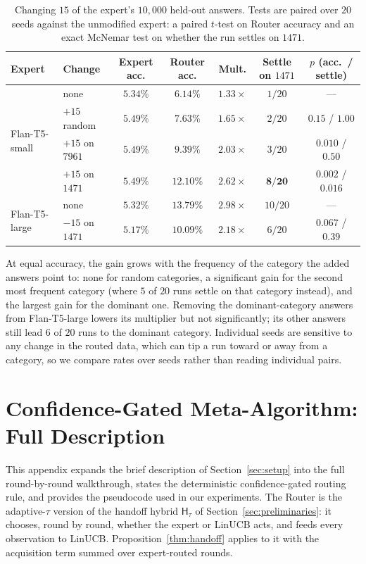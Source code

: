 \documentclass{article}
\theoremstyle{definition}
\theoremstyle{remark}
\theoremstyle{remark}
\newcommand{\Hyb}{\mathsf{H}}
\begin{document}
\begin{table}[h]
\centering
\caption{Changing $15$ of the expert's $10{,}000$ held-out answers. Tests are
paired over $20$ seeds against the unmodified expert: a paired $t$-test on
Router accuracy and an exact McNemar test on whether the run settles on
$1471$.}
\label{tab:inject}
\small
\setlength{\tabcolsep}{4pt}
\begin{tabular}{@{}llccccc@{}}
\toprule
Expert & Change & Expert acc. & Router acc. & Mult. & Settle on $1471$ & $p$ (acc.\ / settle) \\
\midrule
\multirow{4}{*}{Flan-T5-small} & none & $5.34\%$ & $6.14\%$ & $1.33\times$ & $1/20$ & --- \\
& $+15$ random & $5.49\%$ & $7.63\%$ & $1.65\times$ & $2/20$ & $0.15$ / $1.00$ \\
& $+15$ on $7961$ & $5.49\%$ & $9.39\%$ & $2.03\times$ & $3/20$ & $0.010$ / $0.50$ \\
& $+15$ on $1471$ & $5.49\%$ & $\mathbf{12.10\%}$ & $\mathbf{2.62\times}$ & $\mathbf{8/20}$ & $\mathbf{0.002}$ / $\mathbf{0.016}$ \\
\midrule
\multirow{2}{*}{Flan-T5-large} & none & $5.32\%$ & $13.79\%$ & $2.98\times$ & $10/20$ & --- \\
& $-15$ on $1471$ & $5.17\%$ & $10.09\%$ & $2.18\times$ & $6/20$ & $0.067$ / $0.39$ \\
\bottomrule
\end{tabular}
\end{table}

At equal accuracy, the gain grows with the frequency of the category the
added answers point to: none for random categories, a significant gain for
the second most frequent category (where $5$ of $20$ runs settle on that
category instead), and the largest gain for the dominant one. Removing the
dominant-category answers from Flan-T5-large lowers its multiplier but not
significantly; its other answers still lead $6$ of $20$ runs to the
dominant category. Individual seeds are sensitive to any change in the
routed data, which can tip a run toward or away from a category, so we
compare rates over seeds rather than reading individual pairs.

\section{Confidence-Gated Meta-Algorithm: Full Description}
\label{app:meta-algorithm}

This appendix expands the brief description of
Section~\ref{sec:setup} into the full round-by-round walkthrough,
states the deterministic confidence-gated routing rule, and provides
the pseudocode used in our experiments. The Router is the adaptive-$\tau$ version of the handoff hybrid
$\Hyb_\tau$ of Section~\ref{sec:preliminaries}: it chooses, round by round,
whether the expert or LinUCB acts, and feeds every observation to LinUCB.
Proposition~\ref{thm:handoff} applies to it with the acquisition term summed over
expert-routed rounds.
\end{document}
